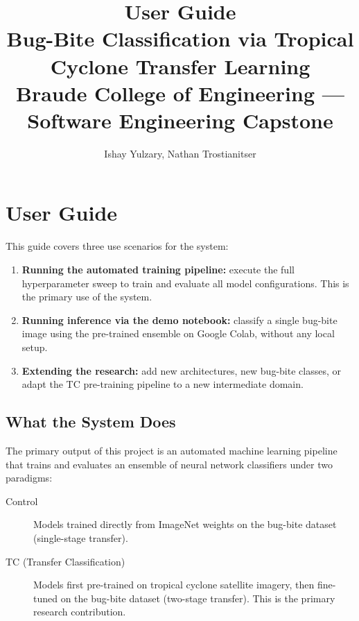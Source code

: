 \documentclass[12pt,a4paper]{article}
\begin{document}
\title{User Guide\\
       \large Bug-Bite Classification via Tropical Cyclone Transfer Learning\\
       Braude College of Engineering --- Software Engineering Capstone}
\author{Ishay Yulzary, Nathan Trostianitser}
\date{}
\maketitle
\tableofcontents
\newpage

\section{User Guide}
\label{app:user-guide}

This guide covers three use scenarios for the system:

\begin{enumerate}
    \item \textbf{Running the automated training pipeline:} execute the
          full hyperparameter sweep to train and evaluate all model
          configurations. This is the primary use of the system.
    \item \textbf{Running inference via the demo notebook:} classify a
          single bug-bite image using the pre-trained ensemble on Google
          Colab, without any local setup.
    \item \textbf{Extending the research:} add new architectures, new
          bug-bite classes, or adapt the TC pre-training pipeline to a
          new intermediate domain.
\end{enumerate}

\subsection{What the System Does}
\label{sec:ug-overview}

The primary output of this project is an automated machine learning
pipeline that trains and evaluates an ensemble of neural network classifiers
under two paradigms:

\begin{description}
    \item[Control] Models trained directly from ImageNet weights on the
          bug-bite dataset (single-stage transfer).
    \item[TC (Transfer Classification)] Models first pre-trained on tropical
          cyclone satellite imagery, then fine-tuned on the bug-bite dataset
          (two-stage transfer). This is the primary research contribution.
\end{description}
\end{document}
